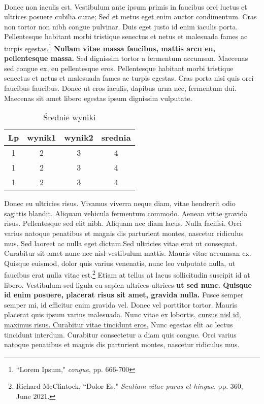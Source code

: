 \documentclass[12pt,a4paper]{article}
\begin{document}
	\\Donec non iaculis est. Vestibulum ante ipsum primis in faucibus orci luctus et ultrices posuere cubilia curae; Sed et metus eget enim auctor condimentum. Cras non tortor non nibh congue pulvinar. Duis eget justo id enim iaculis porta. Pellentesque habitant morbi tristique senectus et netus et malesuada fames ac turpis egestas.\footnote{``Lorem Ipsum," \emph{congue}, pp. 666-700} \textbf{Nullam vitae massa faucibus, mattis arcu eu, pellentesque massa.} Sed dignissim tortor a fermentum accumsan. Maecenas sed congue ex, eu pellentesque eros. Pellentesque habitant morbi tristique senectus et netus et malesuada fames ac turpis egestas. Cras porta nisi quis orci faucibus faucibus. Donec ut eros iaculis, dapibus urna nec, fermentum dui. Maecenas sit amet libero egestas ipsum dignissim vulputate. 
	\begin{table}[H]
		\centering
		\begin{tabular}{||c c c c||} 
			\hline
			Lp & wynik1 & wynik2 & srednia \\ [0.5ex] 
			\hline\hline
			1 & 2 & 3 & 4 \\ 
			\hline
			1 & 2 & 3 & 4 \\
			\hline
			1 & 2 & 3 & 4 \\ [1ex] 
			\hline
		\end{tabular}
	\caption{Średnie wyniki}
	\label{table: SrednieWyniki}
	\end{table}
	Donec eu ultricies risus. Vivamus viverra neque diam, vitae hendrerit odio sagittis blandit. Aliquam vehicula fermentum commodo. Aenean vitae gravida risus. Pellentesque sed elit nibh. Aliquam nec diam lacus. Nulla facilisi. Orci varius natoque penatibus et magnis dis parturient montes, nascetur ridiculus mus. Sed laoreet ac nulla eget dictum.Sed ultricies vitae erat ut consequat. Curabitur sit amet nunc nec nisl vestibulum mattis. Mauris vitae accumsan ex. Quisque euismod, dolor quis varius venenatis, nunc leo vulputate nulla, ut faucibus erat nulla vitae est.\footnote{Richard McClintock, ``Dolor Es," \emph{Sentiam vitae purus et hingue}, pp. 360, June 2021.} Etiam at tellus at lacus sollicitudin suscipit id at libero. Vestibulum sed ligula eu sapien ultrices ultrices \textbf{ut sed nunc. Quisque id enim posuere, placerat risus sit amet, gravida nulla.} Fusce semper semper mi, id efficitur enim gravida vel. Donec vel porttitor tortor. Mauris placerat quis ipsum varius malesuada. Nunc vitae ex lobortis, \underline{cursus nisl id, maximus risus. Curabitur vitae tincidunt eros.} Nunc egestas elit ac lectus tincidunt interdum. Curabitur consectetur a diam quis congue. Orci varius natoque penatibus et magnis dis parturient montes, nascetur ridiculus mus. 
\end{document}
